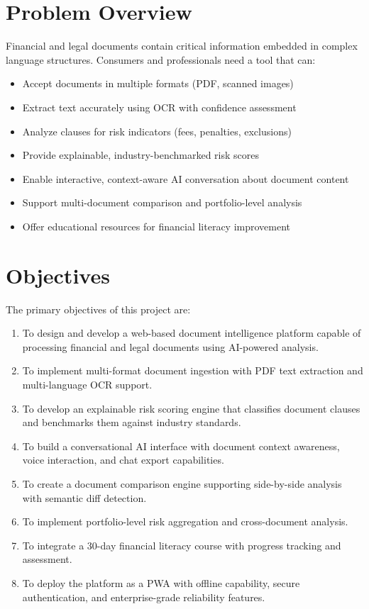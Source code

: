 \documentclass[12pt,a4paper,oneside]{report}
\begin{document}
\section{Problem Overview}

Financial and legal documents contain critical information embedded in complex language structures. Consumers and professionals need a tool that can:
\begin{itemize}[leftmargin=2cm]
  \item Accept documents in multiple formats (PDF, scanned images)
  \item Extract text accurately using OCR with confidence assessment
  \item Analyze clauses for risk indicators (fees, penalties, exclusions)
  \item Provide explainable, industry-benchmarked risk scores
  \item Enable interactive, context-aware AI conversation about document content
  \item Support multi-document comparison and portfolio-level analysis
  \item Offer educational resources for financial literacy improvement
\end{itemize}

\section{Objectives}

The primary objectives of this project are:

\begin{enumerate}[leftmargin=2cm]
  \item To design and develop a web-based document intelligence platform capable of processing financial and legal documents using AI-powered analysis.
  \item To implement multi-format document ingestion with PDF text extraction and multi-language OCR support.
  \item To develop an explainable risk scoring engine that classifies document clauses and benchmarks them against industry standards.
  \item To build a conversational AI interface with document context awareness, voice interaction, and chat export capabilities.
  \item To create a document comparison engine supporting side-by-side analysis with semantic diff detection.
  \item To implement portfolio-level risk aggregation and cross-document analysis.
  \item To integrate a 30-day financial literacy course with progress tracking and assessment.
  \item To deploy the platform as a PWA with offline capability, secure authentication, and enterprise-grade reliability features.
\end{enumerate}
\end{document}
